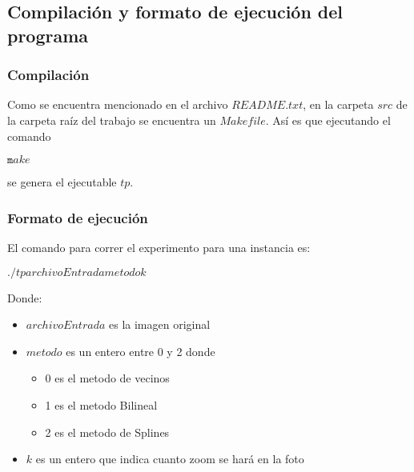 \subsection{Compilación y formato de ejecución del programa}

\subsubsection{Compilación}

Como se encuentra mencionado en el archivo $README.txt$, en la carpeta $src$ de la carpeta raíz del trabajo se encuentra un $Makefile$. Así es que ejecutando el comando

$\texttt  make $

se genera el ejecutable $tp$.

\subsubsection{Formato de ejecución}

El comando para correr el experimento para una instancia es: 

$\texttt ./tp archivoEntrada metodo k $

Donde:

\begin{itemize}
  \item $archivoEntrada$ es la imagen original
  \item $metodo$ es un entero entre 0 y 2 donde 
	
  \begin{itemize}
    \item 0 es el metodo de vecinos
    \item 1 es el metodo Bilineal
    \item 2 es el metodo de Splines
  \end{itemize}

  \item $k$ es un entero que indica cuanto zoom se hará en la foto
\end{itemize}
